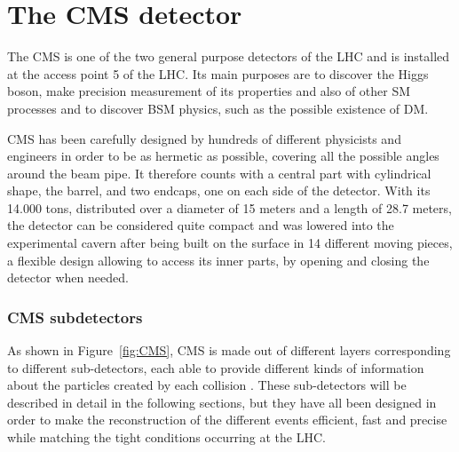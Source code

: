 \documentclass[a4paper, 10pt, openright]{report}
\begin{document}
\section{The \ac{CMS} detector} \label{section:CMS}

The \acf{CMS} is one of the two general purpose detectors of the \ac{LHC} and is installed at the access point 5 of the \ac{LHC}. Its main purposes are to discover the Higgs boson, make precision measurement of its properties and also of other \ac{SM} processes and to discover \ac{BSM} physics, such as the possible existence of \ac{DM}. 

\ac{CMS} has been carefully designed by hundreds of different physicists and engineers in order to be as hermetic as possible, covering all the possible angles around the beam pipe. It therefore counts with a central part with cylindrical shape, the barrel, and two endcaps, one on each side of the detector. With its 14.000 tons, distributed over a diameter of 15 meters and a length of 28.7 meters, the detector can be considered quite compact and was lowered into the experimental cavern after being built on the surface in 14 different moving pieces, a flexible design allowing to access its inner parts, by opening and closing the detector when needed.

\subsubsection*{\acs{CMS} subdetectors}

As shown in Figure~\ref{fig:CMS}, \ac{CMS} is made out of different layers corresponding to different sub-detectors, each able to provide different kinds of information about the particles created by each collision \cite{CMSDescription}. These sub-detectors will be described in detail in the following sections, but they have all been designed in order to make the reconstruction of the different events efficient, fast and precise while matching the tight conditions occurring at the \ac{LHC}.
\end{document}
